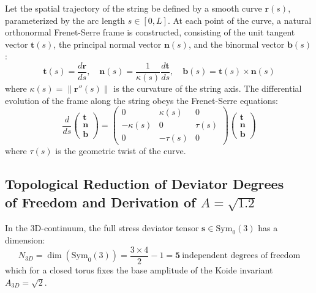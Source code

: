 \documentclass[12pt,a4paper]{article}
\begin{document}
	Let the spatial trajectory of the string be defined by a smooth curve $\mathbf{r}(s)$, parameterized by the arc length $s \in [0, L]$. At each point of the curve, a natural orthonormal Frenet-Serre frame is constructed, consisting of the unit tangent vector $\mathbf{t}(s)$, the principal normal vector $\mathbf{n}(s)$, and the binormal vector $\mathbf{b}(s)$:
	\begin{equation}
		\mathbf{t}(s) = \frac{d\mathbf{r}}{ds}, \quad \mathbf{n}(s) = \frac{1}{\kappa(s)} \frac{d\mathbf{t}}{ds}, \quad \mathbf{b}(s) = \mathbf{t}(s) \times \mathbf{n}(s)
	\end{equation}
	where $\kappa(s) = \|\mathbf{r}''(s)\|$ is the curvature of the string axis. The differential evolution of the frame along the string obeys the Frenet-Serre equations:
	\begin{equation}
		\frac{d}{ds} \begin{pmatrix} \mathbf{t} \\ \mathbf{n} \\ \mathbf{b} \end{pmatrix} = \begin{pmatrix} 0 & \kappa(s) & 0 \\ -\kappa(s) & 0 & \tau(s) \\ 0 & -\tau(s) & 0 \end{pmatrix} \begin{pmatrix} \mathbf{t} \\ \mathbf{n} \\ \mathbf{b} \end{pmatrix}
	\end{equation}
	where $\tau(s)$ is the geometric twist of the curve.
	
	\subsection{Topological Reduction of Deviator Degrees\\ of Freedom and Derivation of $A = \sqrt{1.2}$}
	In the 3D-continuum, the full stress deviator tensor $\mathbf{s} \in \mathrm{Sym}_0(3)$ has a dimension:
	\begin{equation}
		N_{3D} = \dim(\mathrm{Sym}_0(3)) = \frac{3 \times 4}{2} - 1 = \mathbf{5} \ \text{independent degrees of freedom}
	\end{equation}
	which for a closed torus fixes the base amplitude of the Koide invariant $A_{3D} = \sqrt{2}$.
	
\end{document}
